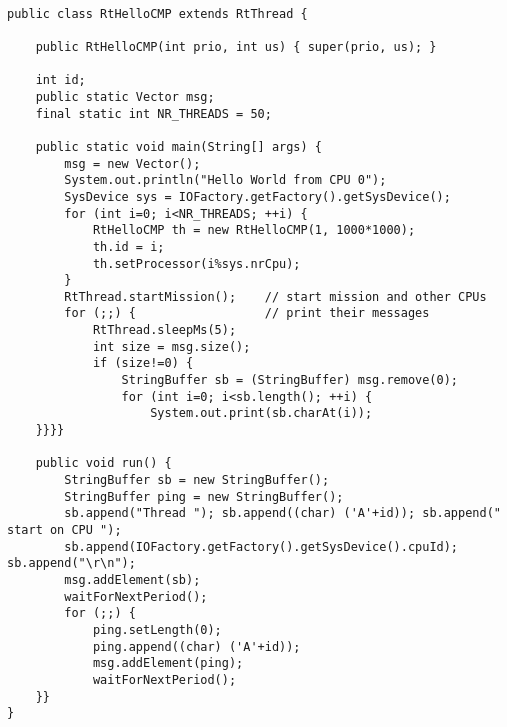 \begin{lstlisting}[float=t,caption={A CMP version of Hello World with the scheduler},
label=lst:cmp:hello:rtthread]

public class RtHelloCMP extends RtThread {

    public RtHelloCMP(int prio, int us) { super(prio, us); }

    int id;
    public static Vector msg;
    final static int NR_THREADS = 50;

    public static void main(String[] args) {
        msg = new Vector();
        System.out.println("Hello World from CPU 0");
        SysDevice sys = IOFactory.getFactory().getSysDevice();
        for (int i=0; i<NR_THREADS; ++i) {
            RtHelloCMP th = new RtHelloCMP(1, 1000*1000);
            th.id = i;
            th.setProcessor(i%sys.nrCpu);
        }
        RtThread.startMission();    // start mission and other CPUs
        for (;;) {                  // print their messages
            RtThread.sleepMs(5);
            int size = msg.size();
            if (size!=0) {
                StringBuffer sb = (StringBuffer) msg.remove(0);
                for (int i=0; i<sb.length(); ++i) {
                    System.out.print(sb.charAt(i));
    }}}}

    public void run() {
        StringBuffer sb = new StringBuffer();
        StringBuffer ping = new StringBuffer();
        sb.append("Thread "); sb.append((char) ('A'+id)); sb.append(" start on CPU ");
        sb.append(IOFactory.getFactory().getSysDevice().cpuId); sb.append("\r\n");
        msg.addElement(sb);
        waitForNextPeriod();
        for (;;) {
            ping.setLength(0);
            ping.append((char) ('A'+id));
            msg.addElement(ping);
            waitForNextPeriod();
    }}
}
\end{lstlisting}
